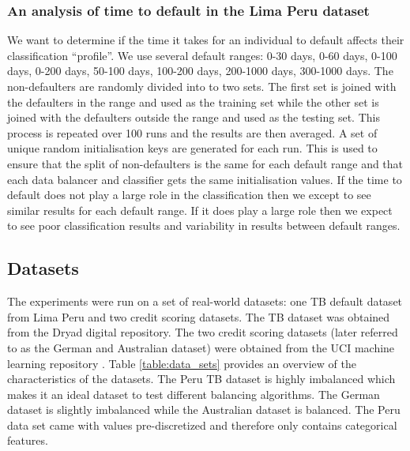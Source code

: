 \documentclass{sig-alternate-05-2015}
\begin{document}
	\subsubsection{An analysis of time to default in the Lima Peru dataset}
	We want to determine if the time it takes for an individual to default affects their classification ``profile''. We use several default ranges: 0-30 days, 0-60 days, 0-100 days, 0-200 days, 50-100 days, 100-200 days, 200-1000 days, 300-1000 days. The non-defaulters are randomly divided into to two sets. The first set is joined with the defaulters in the range and used as the training set while the other set is joined with the defaulters outside the range and used as the testing set. This process is repeated over 100 runs and the results are then averaged. A set of unique random initialisation keys are generated for each run. This is used to ensure that the split of non-defaulters is the same for each default range and that each data balancer and classifier gets the same initialisation values. If the time to default does not play a large role in the classification then we except to see similar results for each default range. If it does play a large role then we expect to see poor classification results and variability in results between default ranges.
	
	
	\subsection{Datasets}
	The experiments were run on a set of real-world datasets: one TB default dataset from Lima Peru \cite{Lackey:10356751520150601} and two credit scoring datasets. The TB dataset was obtained from the Dryad digital repository. The two credit scoring datasets (later referred to as the German and Australian dataset) were obtained from the UCI machine learning repository \cite{Lichman:2013}. Table \ref{table:data_sets} provides an overview of the characteristics of the datasets. The Peru TB dataset is highly imbalanced which makes it an ideal dataset to test different balancing algorithms. The German dataset is slightly imbalanced while the Australian dataset is balanced. The Peru data set came with values pre-discretized and therefore only contains categorical features.
	\begin{table}
		\centering
		\caption{Data set summary}
		\label{table:data_sets}
	\end{table}
	
\end{document}

